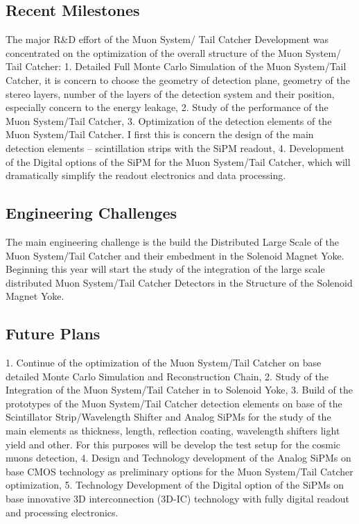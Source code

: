 \subsection{Recent Milestones}
The major R\&D effort of the Muon System/ Tail Catcher Development was concentrated on the optimization of the overall structure of the Muon System/ Tail Catcher:
1.	Detailed Full Monte Carlo Simulation of the Muon System/Tail Catcher, it is concern to choose the geometry of detection plane, geometry of the stereo layers, number of the layers of the detection system and their position, especially concern to the energy leakage,
2.	Study of the performance of the Muon System/Tail Catcher,
3.	Optimization of the detection elements of the Muon System/Tail Catcher. I first this is concern the design of the main detection elements – scintillation strips with the SiPM readout,
4.	Development of the Digital options of the SiPM for the Muon System/Tail Catcher, which will dramatically simplify the readout electronics and data processing.


\subsection{Engineering Challenges}
The main engineering challenge is the build the Distributed Large Scale of the Muon System/Tail Catcher and their embedment in the Solenoid Magnet Yoke. Beginning this year will start the study of the integration of the large scale distributed Muon System/Tail Catcher Detectors in the Structure of the Solenoid Magnet Yoke.

\subsection{Future Plans}
1.	Continue of the optimization of the Muon System/Tail Catcher on base detailed Monte Carlo Simulation and Reconstruction Chain,
2.	Study of the Integration of the Muon System/Tail Catcher in to Solenoid Yoke,
3.	Build of the prototypes of the Muon System/Tail Catcher detection elements on base of the Scintillator Strip/Wavelength Shifter and Analog SiPMs for the study of the main elements as thickness, length, reflection coating, wavelength shifters light yield and other. For this purposes will be develop the test setup for the cosmic muons detection,
4.	Design and Technology development of the Analog SiPMs on base CMOS technology as preliminary options for the Muon System/Tail Catcher optimization,
5.	Technology Development of the Digital option of the SiPMs on base innovative 3D interconnection (3D-IC) technology with fully digital readout and processing electronics.

